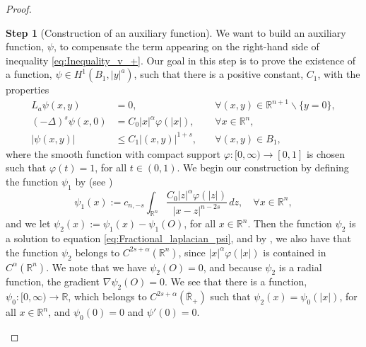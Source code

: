 \documentclass[11pt,reqno]{amsart}
\theoremstyle{definition}
\newtheorem{step}{Step}
\theoremstyle{remark}
\begin{document}
\begin{proof}
\begin{step}[Construction of an auxiliary function]
\label{step:Construction_auxiliary_function_v_+}
We want to build an auxiliary function, $\psi$, to compensate the term appearing on the right-hand side of inequality \eqref{eq:Inequality_v_+}. Our goal in this step is to prove the existence of a function, $\psi \in H^1(B_1, |y|^a)$, such that there is a positive constant, $C_1$, with the properties
\begin{align}
\label{eq:Equation_extension_psi}
L_a\psi(x,y) &= 0,&\quad\forall (x,y)\in {\mathbb{R}}^{n+1}\backslash\{y=0\},\\
\label{eq:Fractional_laplacian_psi}
(-\Delta)^s\psi(x,0) &=C_0|x|^{\alpha}\varphi(|x|),&\quad\forall x\in {\mathbb{R}}^n,\\
\label{eq:Growth_psi_n+1_dim}
|\psi(x,y)| &\leq C_1 |(x,y)|^{1+s},&\quad\forall (x,y)\in B_1,
\end{align}
where the smooth function with compact support $\varphi:[0,\infty)\rightarrow [0,1]$ is chosen such that $\varphi(t)=1$, for all $t \in (0,1)$. We begin our construction by defining the function $\psi_1$ by (see \cite[p. 76]{Silvestre_2007})
$$
\psi_1(x):= c_{n,-s}\int_{{\mathbb{R}}^n}\frac{C_0|z|^{\alpha}\varphi(|z|)}{|x-z|^{n-2s}}\, dz,\quad\forall x\in{\mathbb{R}}^n,
$$
and we let $\psi_2(x):=\psi_1(x)-\psi_1(O)$, for all $x \in {\mathbb{R}}^n$. Then the function $\psi_2$ is a solution to equation \eqref{eq:Fractional_laplacian_psi}, and by \cite[Proposition 2.8]{Silvestre_2007}, we also have that the function $\psi_2$ belongs to $C^{2s+\alpha}({\mathbb{R}}^n)$, since $|x|^{\alpha}\varphi(|x|)$ is contained in $C^{\alpha}({\mathbb{R}}^n)$. We note that we have $\psi_2(O)=0$, and because $\psi_2$ is a radial function, the gradient $\nabla \psi_2(O)=0$. We see that there is a function, $\psi_0:[0,\infty)\rightarrow{\mathbb{R}}$, which belongs to $C^{2s+\alpha}(\bar{\mathbb{R}}_+)$ such that $\psi_2(x)=\psi_0(|x|)$, for all $x\in{\mathbb{R}}^n$, and $\psi_0(0)=0$ and $\psi'(0)=0$.


\end{step}
\end{proof}
\end{document}
